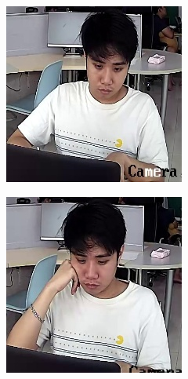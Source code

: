 \begin{figure}[!ht]
\begin{subfigure}[b]{0.45\linewidth}
    \end{subfigure}
    \begin{subfigure}[b]{0.45\linewidth}
      \includegraphics[width=\linewidth]{appendix/sit/000_CXS0_D0_005740.jpg}
    \end{subfigure}
    \begin{subfigure}[b]{0.45\linewidth}
      \includegraphics[width=\linewidth]{appendix/sit/000_CXS0_D0_006436.jpg}

\end{subfigure}
\end{figure}
